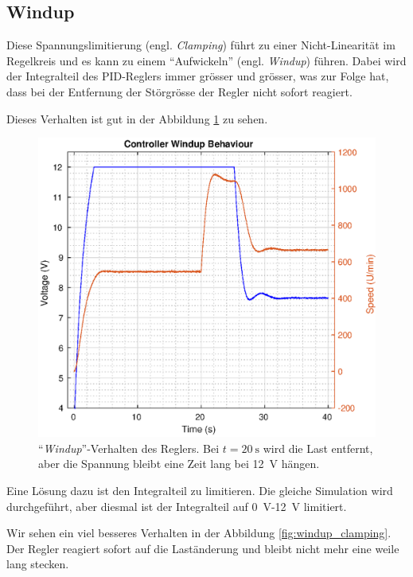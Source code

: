 \subsection{Windup}

Diese   Spannungslimitierung  (engl.  \textit{Clamping})  f\"uhrt   zu   einer
Nicht-Linearit\"at  im Regelkreis und es kann zu einem  ``Aufwickeln''  (engl.
\textit{Windup}) f\"uhren. Dabei wird der  Integralteil  des PID-Reglers immer
gr\"osser  und gr\"osser, was zur Folge  hat,  dass  bei  der  Entfernung  der
St\"orgr\"osse der Regler nicht sofort reagiert.

Dieses Verhalten ist gut in der Abbildung \ref{fig:windup} zu sehen.

\begin{figure}[H]
    \centering
    \includegraphics[width=\imagewidth]{images/windup}
    \caption{``\textit{Windup}''-Verhalten des Reglers. Bei $t=\SI{20}{\second}$ wird die Last entfernt, aber die Spannung bleibt eine Zeit lang bei \SI{12}{\volt} h\"angen.}
    \label{fig:windup}
\end{figure}

Eine L\"osung dazu ist den Integralteil zu limitieren. Die  gleiche Simulation
wird    durchgef\"uhrt,    aber   diesmal    ist    der    Integralteil    auf
\SI{0}{\volt}-\SI{12}{\volt} limitiert.

Wir    sehen    ein    viel    besseres    Verhalten    in    der    Abbildung
\ref{fig:windup_clamping}. Der Regler reagiert sofort  auf  die Last\"anderung
und bleibt nicht mehr eine weile lang stecken.

